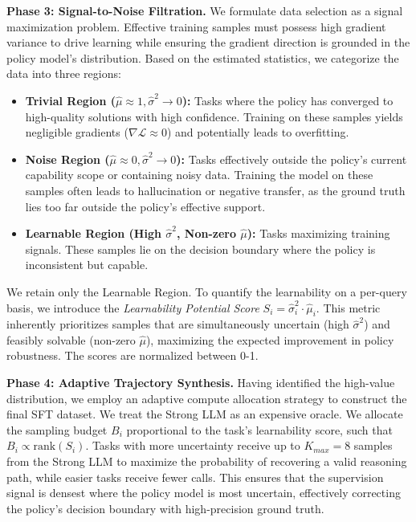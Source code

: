 \documentclass{article} %
\begin{document}
\textbf{Phase 3: Signal-to-Noise Filtration.} 
We formulate data selection as a signal maximization problem. Effective training samples must possess high gradient variance to drive learning while ensuring the gradient direction is grounded in the policy model's distribution. Based on the estimated statistics, we categorize the data into three regions:
\begin{itemize}
    \item \textbf{Trivial Region ($\hat{\mu} \approx 1, \hat{\sigma}^2 \to 0$):} Tasks where the policy has converged to high-quality solutions with high confidence. Training on these samples yields negligible gradients ($\nabla \mathcal{L} \approx 0$) and potentially leads to overfitting.
    \item \textbf{Noise Region ($\hat{\mu} \approx 0, \hat{\sigma}^2 \to 0$):} Tasks effectively outside the policy's current capability scope or containing noisy data. Training the model on these samples often leads to hallucination or negative transfer, as the ground truth lies too far outside the policy's effective support.
    \item \textbf{Learnable Region (High $\hat{\sigma}^2$, Non-zero $\hat{\mu}$):} Tasks maximizing training signals. These samples lie on the decision boundary where the policy is inconsistent but capable.
\end{itemize}
We retain only the Learnable Region. To quantify the learnability on a per-query basis, we introduce the \textit{Learnability Potential Score} $S_i = \hat{\sigma}^2_i \cdot \hat{\mu}_i$. This metric inherently prioritizes samples that are simultaneously uncertain (high $\hat{\sigma}^2$) and feasibly solvable (non-zero $\hat{\mu}$), maximizing the expected improvement in policy robustness. The scores are normalized between 0-1.

\textbf{Phase 4: Adaptive Trajectory Synthesis.} 
Having identified the high-value distribution, we employ an adaptive compute allocation strategy to construct the final SFT dataset. We treat the Strong LLM as an expensive oracle. We allocate the sampling budget $B_i$ proportional to the task's learnability score, such that $B_i \propto \text{rank}(S_i)$. Tasks with more uncertainty receive up to $K_{max}=8$ samples from the Strong LLM to maximize the probability of recovering a valid reasoning path, while easier tasks receive fewer calls. This ensures that the supervision signal is densest where the policy model is most uncertain, effectively correcting the policy's decision boundary with high-precision ground truth.
\end{document}
